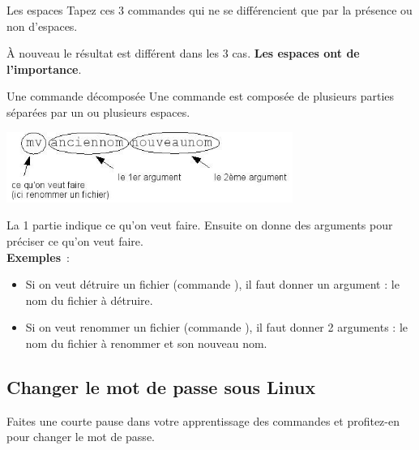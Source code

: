 \documentclass[a4paper,11pt]{style-esi/td}
\begin{document}
	\begin{Experience}{Les espaces} 
		Tapez ces 3 commandes qui ne se différencient 
		que par la présence ou non d'espaces.
		\begin{steps}
		\item {}
		\item {}
		\item {}
		\end{steps}
		À nouveau le résultat est différent dans les 3 cas. 
		\textbf{Les espaces ont de l'importance}.
	\end{Experience}				

	\begin{theorie}{Une commande décomposée}
		Une commande est composée de plusieurs parties 
		séparées par un ou plusieurs espaces. 
		\begin{center}
			\includegraphics[width=0.7\textwidth]{images/commande.jpg}
		\end{center}
		La 1\iere{} partie indique ce qu'on veut faire. 
		Ensuite on donne des arguments pour préciser ce qu'on veut faire.
		\\
		\textbf{Exemples} :
		\begin{itemize}
		\item 
			Si on veut détruire un fichier (commande ), 
			il faut donner un argument : le nom du fichier à détruire.
		\item 
			Si on veut renommer un fichier (commande ), 
			il faut donner 2 arguments : 
			le nom du fichier à renommer et son nouveau nom.
		\end{itemize}
	\end{theorie}

	\subsection{Changer le mot de passe sous Linux}

		Faites une courte pause dans votre apprentissage des commandes
		et profitez-en pour changer le mot de passe.
\end{document}
